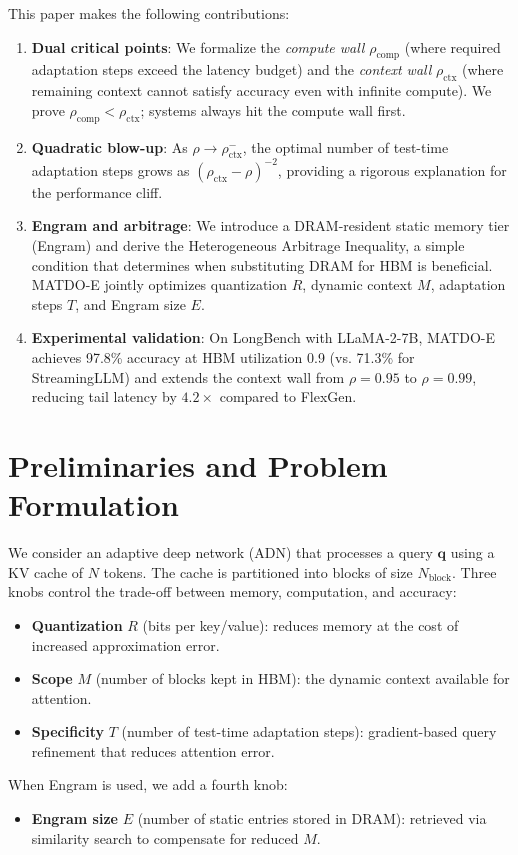 \documentclass[11pt,a4paper]{article}
\theoremstyle{plain}
\theoremstyle{definition}
\begin{document}
This paper makes the following contributions:
\begin{enumerate}
    \item \textbf{Dual critical points}: We formalize the \textit{compute wall} $\rho_{\text{comp}}$ (where required adaptation steps exceed the latency budget) and the \textit{context wall} $\rho_{\text{ctx}}$ (where remaining context cannot satisfy accuracy even with infinite compute). We prove $\rho_{\text{comp}} < \rho_{\text{ctx}}$; systems always hit the compute wall first.
    \item \textbf{Quadratic blow-up}: As $\rho \to \rho_{\text{ctx}}^-$, the optimal number of test-time adaptation steps grows as $(\rho_{\text{ctx}}-\rho)^{-2}$, providing a rigorous explanation for the performance cliff.
    \item \textbf{Engram and arbitrage}: We introduce a DRAM-resident static memory tier (Engram) and derive the Heterogeneous Arbitrage Inequality, a simple condition that determines when substituting DRAM for HBM is beneficial. MATDO-E jointly optimizes quantization $R$, dynamic context $M$, adaptation steps $T$, and Engram size $E$.
    \item \textbf{Experimental validation}: On LongBench with LLaMA-2-7B, MATDO-E achieves 97.8\% accuracy at HBM utilization 0.9 (vs. 71.3\% for StreamingLLM) and extends the context wall from $\rho=0.95$ to $\rho=0.99$, reducing tail latency by $4.2\times$ compared to FlexGen.
\end{enumerate}

\section{Preliminaries and Problem Formulation}
We consider an adaptive deep network (ADN) that processes a query $\mathbf{q}$ using a KV cache of $N$ tokens. The cache is partitioned into blocks of size $N_{\text{block}}$. Three knobs control the trade-off between memory, computation, and accuracy:
\begin{itemize}
    \item \textbf{Quantization} $R$ (bits per key/value): reduces memory at the cost of increased approximation error.
    \item \textbf{Scope} $M$ (number of blocks kept in HBM): the dynamic context available for attention.
    \item \textbf{Specificity} $T$ (number of test-time adaptation steps): gradient-based query refinement that reduces attention error.
\end{itemize}
When Engram is used, we add a fourth knob:
\begin{itemize}
    \item \textbf{Engram size} $E$ (number of static entries stored in DRAM): retrieved via similarity search to compensate for reduced $M$.
\end{itemize}
\end{document}
